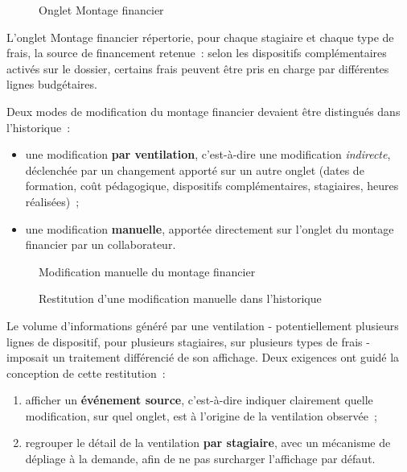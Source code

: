 \begin{figure}[H]
  \centering
  \caption{Onglet Montage financier}
  \label{fig:onglet-montage}
\end{figure}

L'onglet Montage financier répertorie, pour chaque stagiaire et chaque
type de frais, la source de financement retenue~: selon les dispositifs
complémentaires activés sur le dossier, certains frais peuvent être pris
en charge par différentes lignes budgétaires.

Deux modes de modification du montage financier devaient être distingués
dans l'historique~:

\begin{itemize}
  \item une modification \textbf{par ventilation}, c'est-à-dire une
        modification \textit{indirecte}, déclenchée par un changement
        apporté sur un autre onglet (dates de formation, coût
        pédagogique, dispositifs complémentaires, stagiaires, heures
        réalisées)~;
  \item une modification \textbf{manuelle}, apportée directement sur
        l'onglet du montage financier par un collaborateur.
\end{itemize}

\begin{figure}[H]
  \centering
  \caption{Modification manuelle du montage financier}
  \label{fig:montage-manuel}
\end{figure}

\begin{figure}[H]
  \centering
  \caption{Restitution d'une modification manuelle dans l'historique}
  \label{fig:montage-manuel-hist}
\end{figure}

Le volume d'informations généré par une ventilation  -  potentiellement
plusieurs lignes de dispositif, pour plusieurs stagiaires, sur plusieurs
types de frais  -  imposait un traitement différencié de son affichage.
Deux exigences ont guidé la conception de cette restitution~:

\begin{enumerate}
  \item afficher un \textbf{événement source}, c'est-à-dire indiquer
        clairement quelle modification, sur quel onglet, est à l'origine
        de la ventilation observée~;
  \item regrouper le détail de la ventilation \textbf{par stagiaire},
        avec un mécanisme de dépliage à la demande, afin de ne pas
        surcharger l'affichage par défaut.
\end{enumerate}

